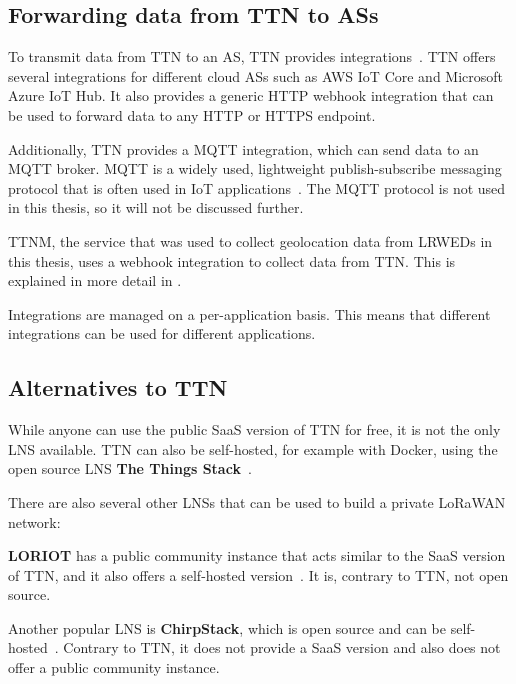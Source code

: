 \subsection{Forwarding data from \acl{TTN} to \aclp{AS}}\label{sec:forwarding-data-from-ttn-to-as}

To transmit data from \ac{TTN} to an \ac{AS}, \ac{TTN} provides integrations~\cite{the_things_network_integrations_2021}.
\ac{TTN} offers several integrations for different cloud \acp{AS} such as \ac{AWS} \ac{IoT} Core and Microsoft Azure \ac{IoT} Hub.
It also provides a generic \ac{HTTP} webhook integration that can be used to forward data to any \ac{HTTP} or \ac{HTTPS} endpoint.

Additionally, \ac{TTN} provides a MQTT integration, which can send data to an MQTT broker.
MQTT is a widely used, lightweight publish-subscribe messaging protocol that is often used in \ac{IoT} applications~\cite{mqtt_mqtt_2022}.
The MQTT protocol is not used in this thesis, so it will not be discussed further.

\ac{TTNM}, the service that was used to collect geolocation data from \aclp{LRWED} in this thesis, uses a webhook integration to collect data from \ac{TTN}.
This is explained in more detail in .

Integrations are managed on a per-application basis.
This means that different integrations can be used for different applications.

\subsection{Alternatives to \acl{TTN}}

While anyone can use the public \ac{SaaS} version of \ac{TTN} for free, it is not the only \ac{LNS} available.
\ac{TTN} can also be self-hosted, for example with Docker, using the open source \ac{LNS} \textbf{The Things Stack}~\cite{the_things_network_host_2023}.

There are also several other \acp{LNS} that can be used to build a private \ac{LoRaWAN} network:

\textbf{LORIOT} has a public community instance that acts similar to the \ac{SaaS} version of \ac{TTN}, and it also offers a self-hosted version~\cite{loriot_ag_loriot_2023}.
It is, contrary to \ac{TTN}, not open source.

Another popular \ac{LNS} is \textbf{ChirpStack}, which is open source and can be self-hosted~\cite{chirpstack_chirpstack_2023}.
Contrary to \ac{TTN}, it does not provide a \ac{SaaS} version and also does not offer a public community instance.

